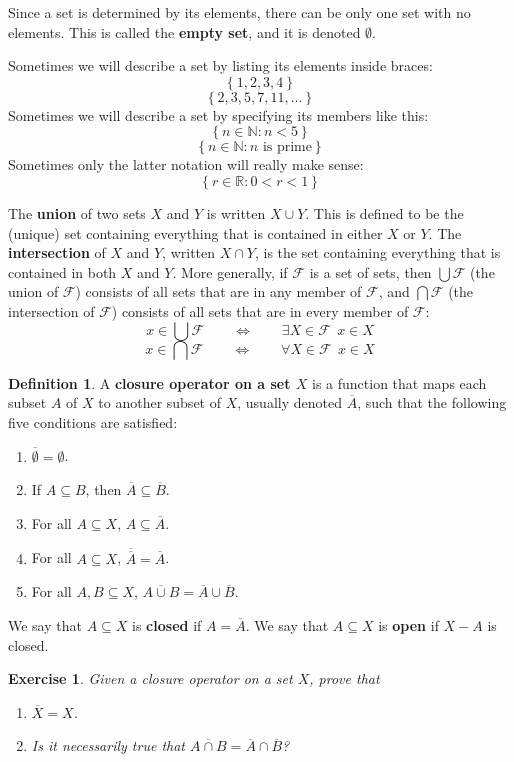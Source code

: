 \documentclass[12pt]{amsart}
\newtheorem{exercise}{Exercise}[section]
\theoremstyle{definition}
\newtheorem{definition}[theorem]{Definition}
\theoremstyle{remark}
\newcommand{\R}{\mathbb{R}}
\newcommand{\N}{\mathbb{N}}
\newcommand{\explicitSet}[1]{\left\lbrace #1 \right\rbrace}
\newcommand{\set}[2]{\explicitSet{#1 \colon #2}}
\newcommand{\0}{\emptyset}
\newcommand{\closure}[1]{\overline{#1}}
\newcommand{\F}{\mathcal F}
\begin{document}
Since a set is determined by its elements, there can be only one set with no elements. This is called the \textbf{empty set}, and it is denoted $\0$.

Sometimes we will describe a set by listing its elements inside braces:
$$\explicitSet{1,2,3,4}$$
$$\explicitSet{2,3,5,7,11,\dots}$$
Sometimes we will describe a set by specifying its members like this:
$$\set{n \in \N}{n < 5}$$
$$\set{n \in \N}{n \text{ is prime}}$$
Sometimes only the latter notation will really make sense:
$$\set{r \in \R}{0 < r < 1}$$

The \textbf{union} of two sets $X$ and $Y$ is written $X \cup Y$. This is defined to be the (unique) set containing everything that is contained in either $X$ or $Y$. The \textbf{intersection} of $X$ and $Y$, written $X \cap Y$, is the set containing everything that is contained in both $X$ and $Y$. More generally, if $\F$ is a set of sets, then $\bigcup \F$ (the union of $\F$) consists of all sets that are in any member of $\F$, and $\bigcap \F$ (the intersection of $\F$) consists of all sets that are in every member of $\F$:
$$x \in \bigcup \F \qquad \Leftrightarrow \qquad \exists X \in \F \ \ x \in X$$
$$x \in \bigcap \F \qquad \Leftrightarrow \qquad \forall X \in \F \ \ x \in X$$

\begin{definition}A \textbf{closure operator on a set $X$} is a function that maps each subset $A$ of $X$ to another subset of $X$, usually denoted $\closure{A}$, such that the following five conditions are satisfied:
\begin{enumerate}
\item $\closure{\0} = \0$.
\item If $A \subseteq B$, then $\closure{A} \subseteq \closure{B}$.
\item For all $A \subseteq X$, $A \subseteq \closure{A}$.
\item For all $A \subseteq X$, $\closure{\closure{A}} = \closure{A}$.
\item For all $A,B \subseteq X$, $\closure{A \cup B} = \closure{A} \cup \closure{B}$.
\end{enumerate} 
We say that $A \subseteq X$ is \textbf{closed} if $A = \closure{A}$. We say that $A \subseteq X$ is \textbf{open} if $X-A$ is closed.
\end{definition}

\begin{exercise}
Given a closure operator on a set $X$, prove that
\begin{enumerate}
\item $\closure{X} = X$.
\item Is it necessarily true that $\closure{A \cap B} = \closure{A} \cap \closure{B}$?
\end{enumerate}
\end{exercise}
\end{document}
